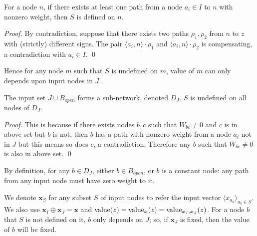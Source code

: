 			\begin{lemma}\label{lem:sign}
				For a node $n$, if there exists at least one path from a node $a_i\in I$ to $n$ with nonzero weight, then $S$ is defined on $n$.
			\end{lemma}
			
			\begin{proof}
				By contradiction, suppose that there exists two paths $\rho_1,\rho_2$ from $n$ to $z$ with (strictly) different signs. The pair $\langle a_i,n\rangle \cdot \rho_1$ and $\langle a_i,n\rangle \cdot \rho_2$ is compensating, a contradiction with $a_i\in I$. \qed
			\end{proof}


			Hence for any node $m$ such that $S$ is undefined on $m$, value of $m$ can only depends upon input nodes in $J$.
			
			\iffalse
			\begin{lemma}
				If $n$ is in the layer after $m$, then $S(n), S(m)$ are both defined
				with $S(n) \neq 0$ and $W_{mn}\neq 0$, then $sign(W_{mn})S(n)=S(m)$.
			\end{lemma}
			
			\begin{proof}
				This is proved in the first section of appendix. \qed
			\end{proof}

			\fi
			
			\begin{lemma}\label{lem:subnetwork2}
				The input set $J \cup B_{open}$ forms a sub-network, denoted $D_J$. 
				$S$ is undefined on all nodes of $D_J$.
			\end{lemma}
			
			\begin{proof}
				This is because if there exists nodes $b,c$ such that $W_{bc}\neq 0$ and $c$ is in above set but $b$ is not, then $b$ has a path with nonzero weight from a node $a_i$ not in $J$ but this means so does $c$, a contradiction. Therefore any $b$ such that $W_{bc}\neq 0$ is also in above set. \qed
			\end{proof}
			
			By definition, for any $b\in D_J$, either $b\in B_{open}$, or $b$ is a constant node: any path from any input node must have zero weight to it.
			
			We denote $\boldsymbol{x}_S$ for any subset $S$ of input nodes to refer the input vector $\langle x_{a_k}\rangle_{a_k\in S}$. We also use $\boldsymbol{x}_I\oplus \boldsymbol{x}_J = \boldsymbol{x}$ and ${\textrm{value}}(z)={\textrm{value}}_{\boldsymbol{x}}(z)={\textrm{value}}_{\boldsymbol{x}_I,\boldsymbol{x}_J} (z)$. For a node $b$ that $S$ is not defined on it, $b$ only depends on $J$; so, if $\boldsymbol{x}_J$ is fixed, then the value of $b$ will be fixed.
			
